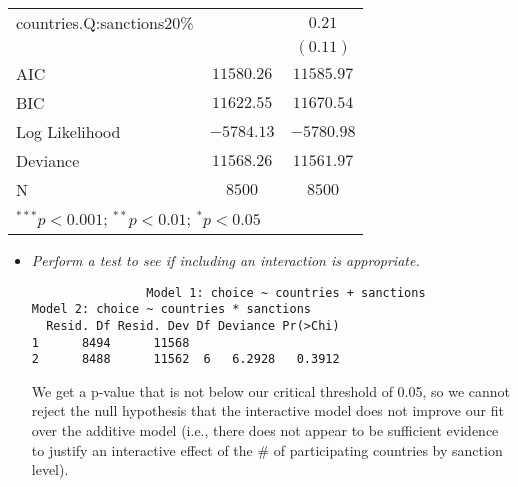 \documentclass[12pt,letterpaper]{article}
\begin{document}
\begin{enumerate}
\begin{enumerate}
\begin{table}[h!]
\begin{adjustbox}{width=.475\textwidth}
\begin{tabular}{l c c}
countries.Q:sanctions20\% &               & $0.21$        \\
                          &               & $(0.11)$      \\
\hline
AIC                       & $11580.26$    & $11585.97$    \\
BIC                       & $11622.55$    & $11670.54$    \\
Log Likelihood            & $-5784.13$    & $-5780.98$    \\
Deviance                  & $11568.26$    & $11561.97$    \\
N               & $8500$        & $8500$        \\
\hline
\multicolumn{3}{l}{\scriptsize{$^{***}p<0.001$; $^{**}p<0.01$; $^{*}p<0.05$}}
\end{tabular}
	\end{adjustbox}

\end{table}
		
	
		\begin{itemize}
			\item \textit{Perform a test to see if including an interaction is appropriate.}
			
			 
			
			\begin{verbatim}
				Model 1: choice ~ countries + sanctions
Model 2: choice ~ countries * sanctions
  Resid. Df Resid. Dev Df Deviance Pr(>Chi)
1      8494      11568                     
2      8488      11562  6   6.2928   0.3912
			\end{verbatim}
			We get a p-value that is not below our critical threshold of 0.05, so we cannot reject the null hypothesis that the interactive model does not improve our fit over the additive model (i.e., there does not appear to be sufficient evidence to justify an interactive effect of the \# of participating countries by sanction level).
			
		\end{itemize}
	\end{enumerate}
\end{enumerate}
\end{document}
